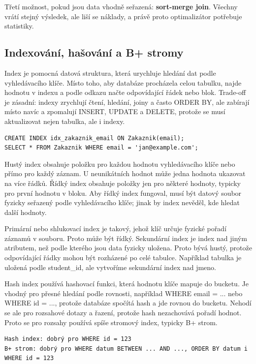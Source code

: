 \documentclass[11pt,a4paper]{article}
\begin{document}
Třetí možnost, pokud jsou data vhodně seřazená: \textbf{sort-merge join}. Všechny vrátí stejný výsledek, ale liší se náklady, a právě proto optimalizátor potřebuje statistiky.

\subsection*{Indexování, hašování a B+ stromy}

Index je pomocná datová struktura, která urychluje hledání dat podle vyhledávacího klíče. Místo toho, aby databáze procházela celou tabulku, najde hodnotu v indexu a podle odkazu načte odpovídající řádek nebo blok. Trade-off je zásadní: indexy zrychlují čtení, hledání, joiny a často ORDER BY, ale zabírají místo navíc a zpomalují INSERT, UPDATE a DELETE, protože se musí aktualizovat nejen tabulka, ale i indexy.

\begin{codebox}
\small
\begin{verbatim}
CREATE INDEX idx_zakaznik_email ON Zakaznik(email);
SELECT * FROM Zakaznik WHERE email = 'jan@example.com';
\end{verbatim}
\end{codebox}

Hustý index obsahuje položku pro každou hodnotu vyhledávacího klíče nebo přímo pro každý záznam. U neunikátních hodnot může jedna hodnota ukazovat na více řádků. Řídký index obsahuje položky jen pro některé hodnoty, typicky pro první hodnotu v bloku. Aby řídký index fungoval, musí být datový soubor fyzicky seřazený podle vyhledávacího klíče; jinak by index nevěděl, kde hledat další hodnoty.

Primární nebo shlukovací index je takový, jehož klíč určuje fyzické pořadí záznamů v souboru. Proto může být řídký. Sekundární index je index nad jiným atributem, než podle kterého jsou data fyzicky uložena. Proto bývá hustý, protože odpovídající řádky mohou být rozházené po celé tabulce. Například tabulka je uložená podle student\_id, ale vytvoříme sekundární index nad jmeno.

Hash index používá hashovací funkci, která hodnotu klíče mapuje do bucketu. Je vhodný pro přesné hledání podle rovnosti, například WHERE email = ... nebo WHERE id = ..., protože databáze spočítá hash a jde rovnou do bucketu. Nehodí se ale pro rozsahové dotazy a řazení, protože hash nezachovává pořadí hodnot. Proto se pro rozsahy používá spíše stromový index, typicky B+ strom.

\begin{codebox}
\small
\begin{verbatim}
Hash index: dobrý pro WHERE id = 123
B+ strom: dobrý pro WHERE datum BETWEEN ... AND ..., ORDER BY datum i WHERE id = 123
\end{verbatim}
\end{codebox}
\end{document}
